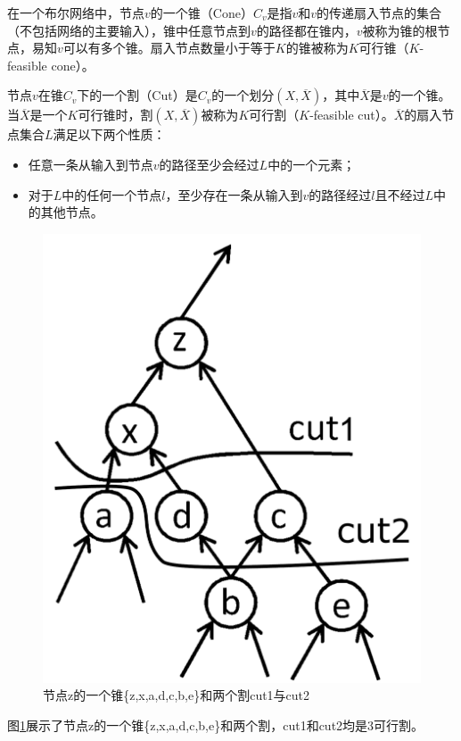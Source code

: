 在一个布尔网络中，节点$v$的一个锥（Cone）$C_v$是指$v$和$v$的传递扇入节点的集合（不包括网络的主要输入），锥中任意节点到$v$的路径都在锥内，$v$被称为锥的根节点，易知$v$可以有多个锥\cite{LS:exact_rewriting,FPGA:Jason_Cong_1993}。扇入节点数量小于等于$K$的锥被称为$K$可行锥（$K$-feasible cone）\cite{FPGA:Jason_Cong_1999_cut_ranking}。

节点$v$在锥$C_v$下的一个割（Cut）是$C_v$的一个划分$(X,\overline{X})$，其中$\overline{X}$是$v$的一个锥。当$\overline{X}$是一个$K$可行锥时，割$(X,\overline{X})$被称为$K$可行割（$K$-feasible cut）\cite{FPGA:Jason_Cong_1999_cut_ranking}。$\overline{X}$的扇入节点集合$L$满足以下两个性质：
\begin{itemize}
    \item 任意一条从输入到节点$v$的路径至少会经过$L$中的一个元素；
    \item 对于$L$中的任何一个节点$l$，至少存在一条从输入到$v$的路径经过$l$且不经过$L$中的其他节点。
\end{itemize}
\begin{figure}[!htbp]
    \centering
    \includegraphics[width=0.4\linewidth]{./figs/LS-z_cone_two_cuts.pdf}
    \caption{节点z的一个锥\{z,x,a,d,c,b,e\}和两个割cut1与cut2}
    \label{LS:z_cone_two_cuts}
\end{figure}
图\ref{LS:z_cone_two_cuts}展示了节点z的一个锥\{z,x,a,d,c,b,e\}和两个割\cite{FPGA:CLB_Anderson}，cut1和cut2均是3可行割。

